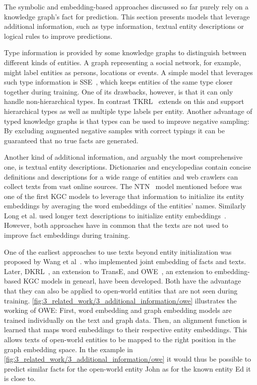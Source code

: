 The symbolic and embedding-based approaches discussed so far purely rely on a knowledge graph's fact for prediction. This section presents models that leverage additional information, such as type information, textual entity descriptions or logical rules to improve predictions.

Type information is provided by some knowledge graphs to distinguish between different kinds of entities. A graph representing a social network, for example, might label entities as persons, locations or events. A simple model that leverages such type information is SSE~\cite{Guo2015SemanticallySK}, which keeps entities of the same type closer together during training. One of its drawbacks, however, is that it can only handle non-hierarchical types. In contrast TKRL~\cite{Xie2016RepresentationLO} extends on this and support hierarchical types as well as multiple type labels per entity. Another advantage of typed knowledge graphs is that types can be used to improve negative sampling: By excluding augmented negative samples with correct typings it can be guaranteed that no true facts are generated.

Another kind of additional information, and arguably the most comprehensive one, is textual entity descriptions. Dictionaries and encyclopedias contain concise definitions and descriptions for a wide range of entities and web crawlers can collect texts from vast online sources. The NTN~\cite{Socher2013ReasoningWN} model mentioned before was one of the first KGC models to leverage that information to initialize its entity embeddings by averaging the word embeddings of the entities' names. Similarly Long et al. used longer text descriptions to initialize entity embeddings~\cite{Long2016LeveragingLR}. However, both approaches have in common that the texts are not used to improve fact embeddings during training.

One of the earliest approaches to use texts beyond entity initialization was proposed by Wang et al~\cite{Wang2014KnowledgeGE}. who implemented joint embedding of facts and texts. Later, DKRL~\cite{Xie2016RepresentationLO}, an extension to TransE, and OWE~\cite{Shah2019AnOE}, an extension to embedding-based KGC models in genearl, have been developed. Both have the advantage that they can also be applied to open-world entities that are not seen during training. \autoref{fig:3_related_work/3_additional_information/owe} illustrates the working of OWE: First, word embedding and graph embedding models are trained individually on the text and graph data. Then, an alignment function is learned that maps word embeddings to their respective entity embeddings. This allows texts of open-world entities to be mapped to the right position in the graph embedding space. In the example in \autoref{fig:3_related_work/3_additional_information/owe} it would thus be possible to predict similar facts for the open-world entity John as for the known entity Ed it is close to.

